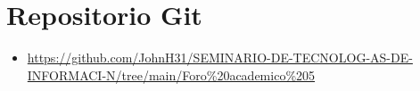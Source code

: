 \documentclass[12pt]{article}
\begin{document}



\section*{Repositorio Git}
\begin{itemize}
    \item \url{https://github.com/JohnH31/SEMINARIO-DE-TECNOLOG-AS-DE-INFORMACI-N/tree/main/Foro%20academico%205}
\end{itemize}
\end{document}
